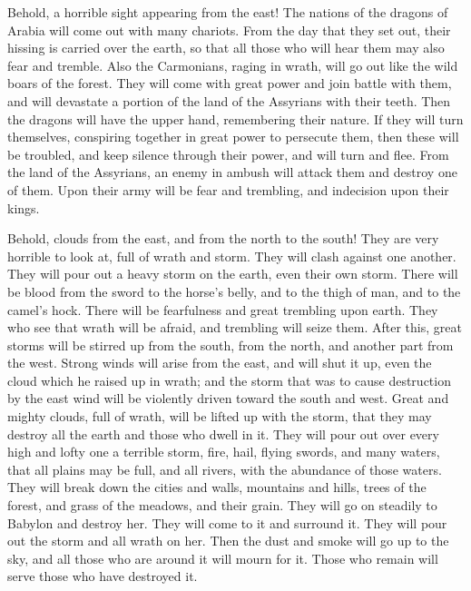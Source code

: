  Behold, a horrible sight appearing from the east!
 The nations of the dragons of Arabia will come out with
many chariots. From the day that they set out, their hissing is carried
over the earth, so that all those who will hear them may also fear and
tremble.  Also the Carmonians, raging in wrath, will go
out like the wild boars of the forest. They will come with great power
and join battle with them, and will devastate a portion of the land of
the Assyrians with their teeth.  Then the dragons will
have the upper hand, remembering their nature. If they will turn
themselves, conspiring together in great power to persecute them,
 then these will be troubled, and keep silence through
their power, and will turn and flee.  From the land of
the Assyrians, an enemy in ambush will attack them and destroy one of
them. Upon their army will be fear and trembling, and indecision upon
their kings.

 Behold, clouds from the east, and from the north to the
south! They are very horrible to look at, full of wrath and storm.
 They will clash against one another. They will pour out
a heavy storm on the earth, even their own storm. There will be blood
from the sword to the horse's belly,  and to the thigh of
man, and to the camel's hock.  There will be fearfulness
and great trembling upon earth. They who see that wrath will be afraid,
and trembling will seize them.  After this, great storms
will be stirred up from the south, from the north, and another part from
the west.  Strong winds will arise from the east, and
will shut it up, even the cloud which he raised up in wrath; and the
storm that was to cause destruction by the east wind will be violently
driven toward the south and west.  Great and mighty
clouds, full of wrath, will be lifted up with the storm, that they may
destroy all the earth and those who dwell in it. They will pour out over
every high and lofty one a terrible storm,  fire, hail,
flying swords, and many waters, that all plains may be full, and all
rivers, with the abundance of those waters.  They will
break down the cities and walls, mountains and hills, trees of the
forest, and grass of the meadows, and their grain.  They
will go on steadily to Babylon and destroy her.  They
will come to it and surround it. They will pour out the storm and all
wrath on her. Then the dust and smoke will go up to the sky, and all
those who are around it will mourn for it.  Those who
remain will serve those who have destroyed it.

